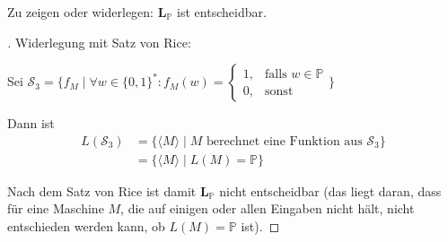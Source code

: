 Zu zeigen oder widerlegen: $\mathbf{L}_\mathbb{P}$ ist entscheidbar.

\begin{proof}[\unskip\nopunct]
Widerlegung mit Satz von Rice:

Sei \(\mathcal{S}_3 = \{f_M \mid \forall w \in \{0, 1\}^* : f_M(w) =
	\begin{cases}
		1, & \text{falls } w \in \mathbb{P}\\
		0, & \text{sonst}
	\end{cases}
	\}
	\)

Dann ist
\begin{align*}
	L(\mathcal{S}_3) &= \{ \langle M \rangle \mid M \text{ berechnet eine Funktion
		aus $\mathcal{S}_3$} \} \\
	&= \{ \langle M \rangle \mid L(M) = \mathbb{P} \}
\end{align*}

Nach dem Satz von Rice ist damit $\mathbf{L}_\mathbb{P}$ nicht entscheidbar (das
liegt daran, dass für eine Maschine $M$, die auf einigen oder allen Eingaben
nicht hält, nicht entschieden werden kann, ob $L(M) = \mathbb{P}$ ist).
\end{proof}
